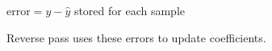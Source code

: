 \documentclass[preview]{standalone}
\begin{document}
\begin{center}
$\mathrm{error} = y - \hat{y}$  stored for each sample\\Reverse pass uses these errors to update coefficients.
\end{center}
\end{document}
